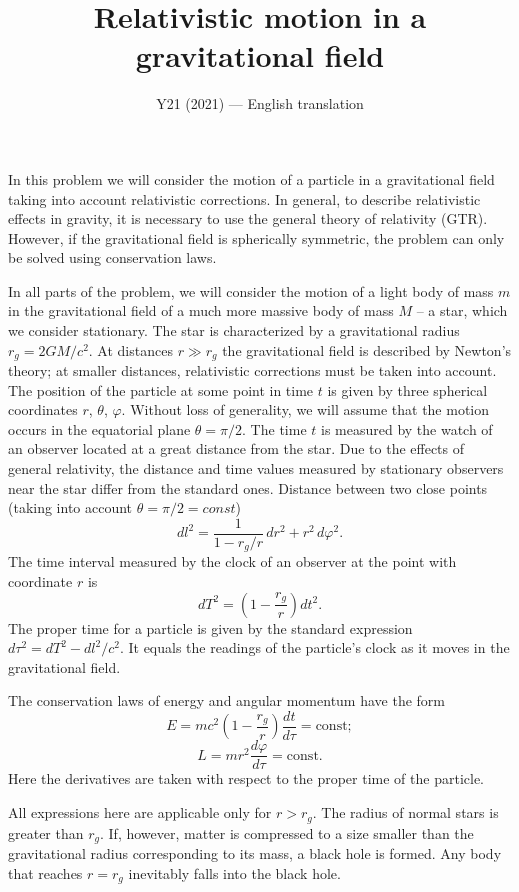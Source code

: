 \documentclass[11pt,a4paper]{article}
\title{\textbf{Relativistic motion in a gravitational field}}
\author{\normalsize Y21 (2021) --- English translation}
\date{}
\begin{document}
\maketitle

In this problem we will consider the motion of a particle in a gravitational field taking into account relativistic corrections. In general, to describe relativistic effects in gravity, it is necessary to use the general theory of relativity (GTR).  However, if the gravitational field is spherically symmetric, the problem can only be solved using conservation laws.

In all parts of the problem, we will consider the motion of a light body of mass $m$ in the gravitational field of a much more massive body of mass $M$ – a star, which we consider stationary. The star is characterized by a gravitational radius $r_g = 2GM/c^2$. At distances $r \gg r_g$ the gravitational field is described by Newton’s theory; at smaller distances, relativistic corrections must be taken into account. The position of the particle at some point in time $t$ is given by three spherical coordinates $r$, $\theta$, $\varphi$.  Without loss of generality, we will assume that the motion occurs in the equatorial plane $\theta = \pi/2$. The time $t$ is measured by the watch of an observer located at a great distance from the star. Due to the effects of general relativity, the distance and time values measured by stationary observers near the star differ from the standard ones. Distance between two close points (taking into account $\theta = \pi/2 = const$) $$dl^2 = \frac{1}{1-r_g/r}\,dr^2 + r^2\,d\varphi^2.$$ The time interval measured by the clock of an observer at the point with coordinate $r$ is $$dT^2 = \left(1 - \frac{r_g}{r}\right) dt^2.$$ The proper time for a particle is given by the standard expression $d\tau^2 = dT^2 - dl^2/c^2$. It equals the readings of the particle's clock as it moves in the gravitational field.

The conservation laws of energy and angular momentum have the form $$E = mc^2\left(1 - \frac{r_g}{r}\right)\frac{dt}{d\tau} = \text{const};$$ $$L = m r^2 \frac{d\varphi}{d\tau} = \text{const}.$$ Here the derivatives are taken with respect to the proper time of the particle.

All expressions here are applicable only for $r > r_g$. The radius of normal stars is greater than $r_g$. If, however, matter is compressed to a size smaller than the gravitational radius corresponding to its mass, a black hole is formed. Any body that reaches $r = r_g$ inevitably falls into the black hole.
\end{document}
